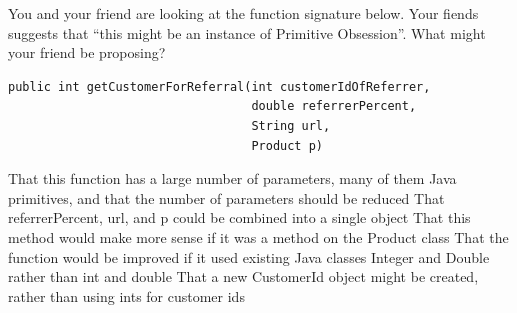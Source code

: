 \documentclass{exam}
\begin{document}
\begin{questions}

\question[1]

You and your friend are looking at the function signature below.  Your fiends suggests that ``this might be an instance of Primitive Obsession''.  What might your friend be proposing?

\begin{lstlisting}
public int getCustomerForReferral(int customerIdOfReferrer, 
                                  double referrerPercent, 
                                  String url, 
                                  Product p) 
\end{lstlisting}
\begin{choices}
\choice That this function has a large number of parameters, many of them Java primitives, and that the number of parameters should be reduced
\choice That referrerPercent, url, and p could be combined into a single object
\choice That this method would make more sense if it was a method on the Product class
\choice That the function would be improved if it used existing Java classes Integer and Double rather than int and double
\correctchoice That a new CustomerId object might be created, rather than using ints for customer ids
\end{choices}




\end{questions}
\end{document}
